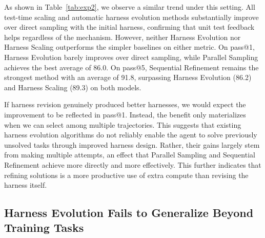 \documentclass{article}
\begin{document}

As shown in Table~\ref{tab:exp2}, we observe a similar trend under this setting. All test-time scaling and automatic harness evolution methods substantially improve over direct sampling with the initial harness, confirming that unit test feedback helps regardless of the mechanism. However, neither Harness Evolution nor Harness Scaling outperforms the simpler baselines on either metric. On pass@1, Harness Evolution barely improves over direct sampling, while Parallel Sampling achieves the best average of 86.0. On pass@5, Sequential Refinement remains the strongest method with an average of 91.8, surpassing Harness Evolution (86.2) and Harness Scaling (89.3) on both models.

If harness revision genuinely produced better harnesses, we would expect the improvement to be reflected in pass@1. Instead, the benefit only materializes when we can select among multiple trajectories. This suggests that existing harness evolution algorithms do not reliably enable the agent to solve previously unsolved tasks through improved harness design. Rather, their gains largely stem from making multiple attempts, an effect that Parallel Sampling and Sequential Refinement achieve more directly and more effectively. This further indicates that refining solutions is a more productive use of extra compute than revising the harness itself.

\subsection{Harness Evolution Fails to Generalize Beyond Training Tasks}
\label{sec:experiment_disjoint_search_eval}

\newcommand{\gain}[1]{\rlap{\,{\scriptsize\textcolor{gray}{(#1)}}}}
\end{document}
